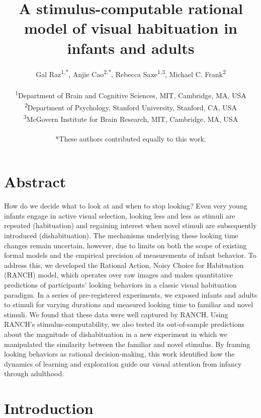 \documentclass[
]{article}
\title{A stimulus-computable rational model of visual habituation in infants and adults}
\author{%
  Gal Raz\textsuperscript{1,*},
  Anjie Cao\textsuperscript{2,*},
  Rebecca Saxe\textsuperscript{1,3},
  Michael C. Frank\textsuperscript{2} \\
  \\
  \textsuperscript{1}Department of Brain and Cognitive Sciences, MIT, Cambridge, MA, USA \\
  \textsuperscript{2}Department of Psychology, Stanford University, Stanford, CA, USA \\
  \textsuperscript{3}McGovern Institute for Brain Research, MIT, Cambridge, MA, USA \\
  \\
  *These authors contributed equally to this work.
}
\date{}
\begin{document}
\maketitle
\section*{Abstract}


How do we decide what to look at and when to stop looking? Even very young infants engage in active visual selection, looking less and less as stimuli are repeated (habituation) and regaining interest when novel stimuli are subsequently introduced (dishabituation). The mechanisms underlying these looking time changes remain uncertain, however, due to limits on both the scope of existing formal models and the empirical precision of measurements of infant behavior. To address this, we developed the Rational Action, Noisy Choice for Habituation (RANCH) model, which operates over raw images and makes quantitative predictions of participants' looking behaviors in a classic visual habituation paradigm. In a series of pre-registered experiments, we exposed infants and adults to stimuli for varying durations and measured looking time to familiar and novel stimuli. We found that these data were well captured by RANCH. Using RANCH's stimulus-computability, we also tested its out-of-sample predictions about the magnitude of dishabituation in a new experiment in which we manipulated the similarity between the familiar and novel stimulus. By framing looking behaviors as rational decision-making, this work identified how the dynamics of learning and exploration guide our visual attention from infancy through adulthood.

\hypertarget{introduction}{%
\section{Introduction}\label{introduction}}
\end{document}
